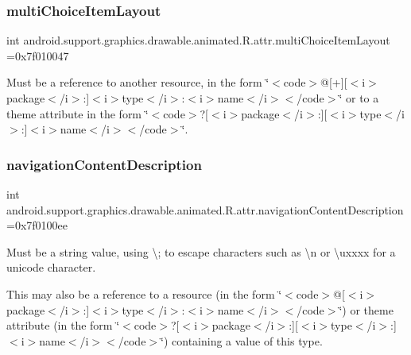 \subsubsection{\texorpdfstring{multi\+Choice\+Item\+Layout}{multiChoiceItemLayout}}
{\footnotesize\ttfamily int android.\+support.\+graphics.\+drawable.\+animated.\+R.\+attr.\+multi\+Choice\+Item\+Layout =0x7f010047\hspace{0.3cm}{\ttfamily [static]}}

Must be a reference to another resource, in the form \char`\"{}$<$code$>$@\mbox{[}+\mbox{]}\mbox{[}$<$i$>$package$<$/i$>$\+:\mbox{]}$<$i$>$type$<$/i$>$\+:$<$i$>$name$<$/i$>$$<$/code$>$\char`\"{} or to a theme attribute in the form \char`\"{}$<$code$>$?\mbox{[}$<$i$>$package$<$/i$>$\+:\mbox{]}\mbox{[}$<$i$>$type$<$/i$>$\+:\mbox{]}$<$i$>$name$<$/i$>$$<$/code$>$\char`\"{}. \mbox{\label{classandroid_1_1support_1_1graphics_1_1drawable_1_1animated_1_1R_1_1attr_ac5f0ecf40dedb2ae0bd6adca442f7a12}} 
\subsubsection{\texorpdfstring{navigation\+Content\+Description}{navigationContentDescription}}
{\footnotesize\ttfamily int android.\+support.\+graphics.\+drawable.\+animated.\+R.\+attr.\+navigation\+Content\+Description =0x7f0100ee\hspace{0.3cm}{\ttfamily [static]}}

Must be a string value, using \textquotesingle{}\textbackslash{};\textquotesingle{} to escape characters such as \textquotesingle{}\textbackslash{}n\textquotesingle{} or \textquotesingle{}\textbackslash{}uxxxx\textquotesingle{} for a unicode character. 

This may also be a reference to a resource (in the form \char`\"{}$<$code$>$@\mbox{[}$<$i$>$package$<$/i$>$\+:\mbox{]}$<$i$>$type$<$/i$>$\+:$<$i$>$name$<$/i$>$$<$/code$>$\char`\"{}) or theme attribute (in the form \char`\"{}$<$code$>$?\mbox{[}$<$i$>$package$<$/i$>$\+:\mbox{]}\mbox{[}$<$i$>$type$<$/i$>$\+:\mbox{]}$<$i$>$name$<$/i$>$$<$/code$>$\char`\"{}) containing a value of this type. \mbox{\label{classandroid_1_1support_1_1graphics_1_1drawable_1_1animated_1_1R_1_1attr_a94a7f2b22303d96b3a08bf09c514c2fb}} 
